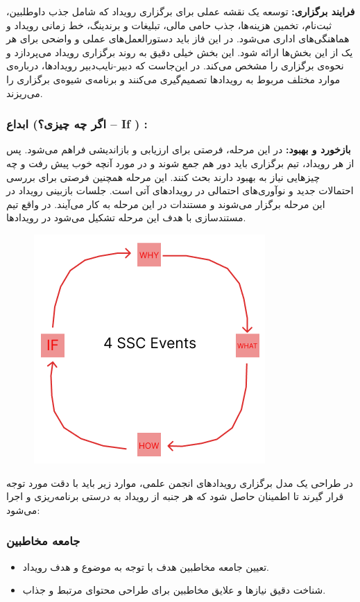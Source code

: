 \textbf{فرایند برگزاری:}
توسعه یک نقشه عملی برای برگزاری رویداد که شامل جذب داوطلبین، ثبت‌نام، تخمین هزینه‌ها، جذب حامی مالی، تبلیغات و برندینگ، خط زمانی رویداد و هماهنگی‌های اداری می‌شود. در این فاز باید دستورالعمل‌های عملی و واضحی برای هر یک از این بخش‌ها ارائه شود. این بخش خیلی دقیق به روند برگزاری رویداد می‌پردازد و نحوه‌ی برگزاری را مشخص می‌کند. در این‌جاست که دبیر-نایب‌دبیر رویدادها، درباره‌ی موارد مختلف مربوط به رویدادها تصمیم‌گیری می‌کنند و برنامه‌ی شیوه‌ی برگزاری را می‌ریزند. 

\subsubsection*{ابداع (اگر چه چیزی؟ – If ) :}

\textbf{بازخورد و بهبود:}
در این مرحله، فرصتی برای ارزیابی و بازاندیشی فراهم می‌شود. پس از هر رویداد، تیم برگزاری باید دور هم جمع شوند و در مورد آنچه خوب پیش رفت و چه چیزهایی نیاز به بهبود دارند بحث کنند. این مرحله همچنین فرصتی برای بررسی احتمالات جدید و نوآوری‌های احتمالی در رویدادهای آتی است. جلسات بازبینی رویداد در این مرحله برگزار می‌شوند و مستندات در این مرحله به کار می‌آیند. در واقع تیم مستندسازی با هدف این مرحله تشکیل می‌شود در رویدادها.

\begin{figure}[h]
	\centering
	\includegraphics{pic1.png}
	\label{fig:label4}
\end{figure}

در طراحی یک مدل برگزاری رویدادهای انجمن علمی، موارد زیر باید با دقت مورد توجه قرار گیرند تا اطمینان حاصل شود که هر جنبه از رویداد به درستی برنامه‌ریزی و اجرا می‌شود:

\subsubsection*{جامعه مخاطبین}
\begin{itemize}
	\item تعیین جامعه مخاطبین هدف با توجه به موضوع و هدف رویداد.
	\item شناخت دقیق نیازها و علایق مخاطبین برای طراحی محتوای مرتبط و جذاب.
\end{itemize}

